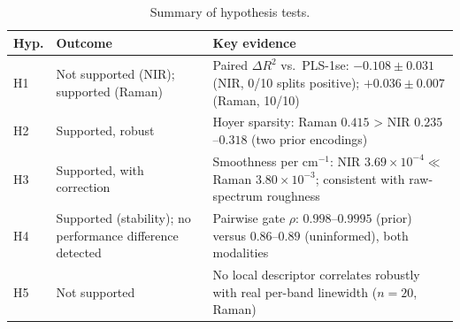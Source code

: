 \documentclass[preprint,12pt]{elsarticle}
\providecommand{\DIFaddbegin}{} %
\providecommand{\DIFaddend}{} %
\providecommand{\DIFdelbegin}{} %
\providecommand{\DIFdelend}{} %
\providecommand{\DIFscaledelfig}{0.5}
\newlength{\DIFdelgraphicswidth} %
\newlength{\DIFdelgraphicsheight} %
\providecommand{\DIFaddincludegraphics}[2][]{{\color{blue}\fbox{\DIFOincludegraphics[#1]{#2}}}} %
\providecommand{\DIFdelincludegraphics}[2][]{%
\sbox{\DIFdelgraphicsbox}{\DIFOincludegraphics[#1]{#2}}%
\settoboxwidth{\DIFdelgraphicswidth}{\DIFdelgraphicsbox} %
\settoboxtotalheight{\DIFdelgraphicsheight}{\DIFdelgraphicsbox} %
\scalebox{\DIFscaledelfig}{%
\parbox[b]{\DIFdelgraphicswidth}{\usebox{\DIFdelgraphicsbox}\\[-\baselineskip] \rule{\DIFdelgraphicswidth}{0em}}\llap{\resizebox{\DIFdelgraphicswidth}{\DIFdelgraphicsheight}{%
\setlength{\unitlength}{\DIFdelgraphicswidth}%
\begin{picture}(1,1)%
\thicklines\linethickness{2pt} %
{\color[rgb]{1,0,0}\put(0,0){\framebox(1,1){}}}%
{\color[rgb]{1,0,0}\put(0,0){\line( 1,1){1}}}%
{\color[rgb]{1,0,0}\put(0,1){\line(1,-1){1}}}%
\end{picture}%
}\hspace*{3pt}}} %
} %
\DeclareRobustCommand{\DIFaddbegin}{\DIFOaddbegin \let\includegraphics\DIFaddincludegraphics} %
\DeclareRobustCommand{\DIFaddend}{\DIFOaddend \let\includegraphics\DIFOincludegraphics} %
\DeclareRobustCommand{\DIFdelbegin}{\DIFOdelbegin \let\includegraphics\DIFdelincludegraphics} %
\DeclareRobustCommand{\DIFdelend}{\DIFOaddend \let\includegraphics\DIFOincludegraphics} %
\begin{document}
\DIFdelbegin %
\DIFdelend \DIFaddbegin \begin{table}[htbp]
\centering
\caption{Summary of hypothesis tests.}
\label{tab:summary}
\begin{tabular}{p{1cm}p{4.6cm}p{7.4cm}}
\toprule
Hyp. & Outcome & Key evidence \\
\midrule
H1 & Not supported (NIR); supported (Raman) & Paired $\Delta R^{2}$ vs.\ PLS-1se: $-0.108\pm0.031$ (NIR, 0/10 splits positive); $+0.036\pm0.007$ (Raman, 10/10) \\
H2 & Supported, robust & Hoyer sparsity: Raman $0.415$ > NIR $0.235$--$0.318$ (two prior encodings) \\
H3 & Supported, with correction & Smoothness per cm$^{-1}$: NIR $3.69\times10^{-4} \ll$ Raman $3.80\times10^{-3}$; consistent with raw-spectrum roughness \\
H4 & Supported (stability); no performance difference detected & Pairwise gate $\rho$: $0.998$--$0.9995$ (prior) versus $0.86$--$0.89$ (uninformed), both modalities \\
H5 & Not supported & No local descriptor correlates robustly with real per-band linewidth ($n=20$, Raman) \\
\bottomrule
\end{tabular}
\end{table}
\DIFaddend 
\end{document}
